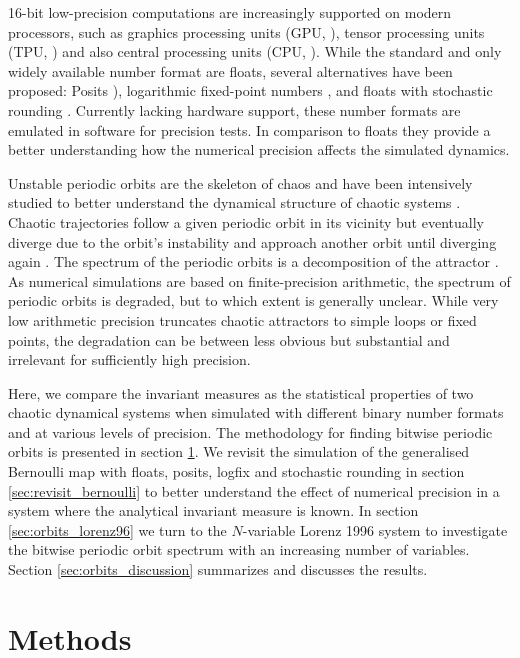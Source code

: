16-bit low-precision computations are increasingly supported on modern processors, such as graphics processing units
(GPU, \cite{Markidis2018}), tensor processing units (TPU, \cite{Jouppi2018}) and also central processing units (CPU,
\cite{Odajima2020,Sato2020}). While the standard and only widely available number format are floats, several alternatives
have been proposed: Posits \citep{Gustafson2017a}), logarithmic fixed-point numbers \citep{Johnson2020}, and
floats with stochastic rounding \citep{Hopkins2020}. Currently lacking hardware support, these number formats are
emulated in software for precision tests. In comparison to floats they provide a better understanding how the numerical
precision affects the simulated dynamics. 

Unstable periodic orbits are the skeleton of chaos \citep{Cvitanovic1991} and have been intensively studied to better
understand the dynamical structure of chaotic systems \citep{Lasagna2020,Leboeuf2004,Ruelle1971}. Chaotic trajectories
follow a given periodic orbit in its vicinity but eventually diverge due to the orbit’s instability and approach another orbit until
diverging again \citep{Maiocchi2021}. The spectrum of the periodic orbits is a decomposition of the attractor \citep{Eckmann2004}.
As numerical simulations are based on finite-precision arithmetic, the spectrum of periodic orbits is degraded, but to which extent
is generally unclear. While very low arithmetic precision truncates chaotic attractors to simple loops or fixed points, the degradation
can be between less obvious but substantial and irrelevant for sufficiently high precision.

Here, we compare the invariant measures as the statistical properties of two chaotic dynamical systems when simulated with
different binary number formats and at various levels of precision. The methodology for finding bitwise periodic orbits is presented
in section \ref{sec:orbits_methods}. We revisit the simulation of the generalised Bernoulli map with floats,
posits, logfix and stochastic rounding in section \ref{sec:revisit_bernoulli} to better understand the effect of numerical precision
in a system where the analytical invariant measure is known. In section \ref{sec:orbits_lorenz96} we turn to the $N$-variable Lorenz
1996 system to investigate the bitwise periodic orbit spectrum with an increasing number of variables. Section \ref{sec:orbits_discussion}
summarizes and discusses the results. 

\section{Methods}
\label{sec:orbits_methods}

